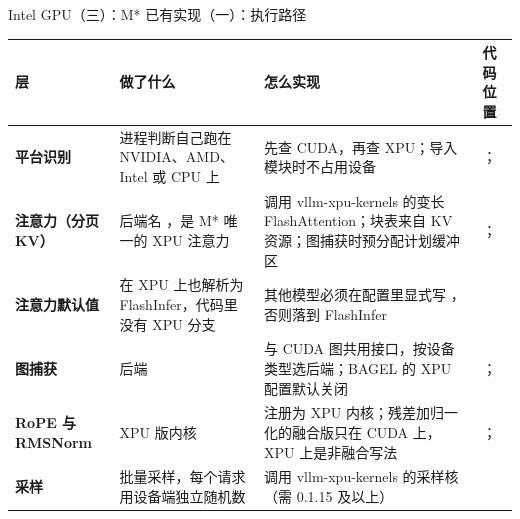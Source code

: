 \begin{frame}[t]{Intel GPU（三）：M* 已有实现（一）：执行路径}
\scriptsize\def\codesize{\relax}
\renewcommand{\arraystretch}{1.12}
\setlength{\tabcolsep}{3pt}
\begin{tabularx}{\textwidth}{>{\bfseries}p{2.2cm} Y Y p{3.6cm}}
\toprule
{}
层 & 做了什么 & 怎么实现 & 代码位置 \\
\midrule
平台识别 & 进程判断自己跑在 NVIDIA、AMD、Intel 或 CPU 上 & 先查 CUDA，再查 XPU；导入模块时不占用设备 & ； \\
注意力（分页 KV） & 后端名 ，是 M* 唯一的 XPU 注意力 & 调用 vllm-xpu-kernels 的变长 FlashAttention；块表来自 KV 资源；图捕获时预分配计划缓冲区 & ； \\
注意力默认值 &  在 XPU 上也解析为 FlashInfer，代码里没有 XPU 分支 & 其他模型必须在配置里显式写 ，否则落到 FlashInfer &  \\
图捕获 &  后端 & 与 CUDA 图共用接口，按设备类型选后端；BAGEL 的 XPU 配置默认关闭 & ； \\
RoPE 与 RMSNorm & XPU 版内核 & 注册为 XPU 内核；残差加归一化的融合版只在 CUDA 上，XPU 上是非融合写法 & ； \\
采样 & 批量采样，每个请求用设备端独立随机数 & 调用 vllm-xpu-kernels 的采样核（需 0.1.15 及以上） &  \\
\bottomrule
\end{tabularx}
\end{frame}


